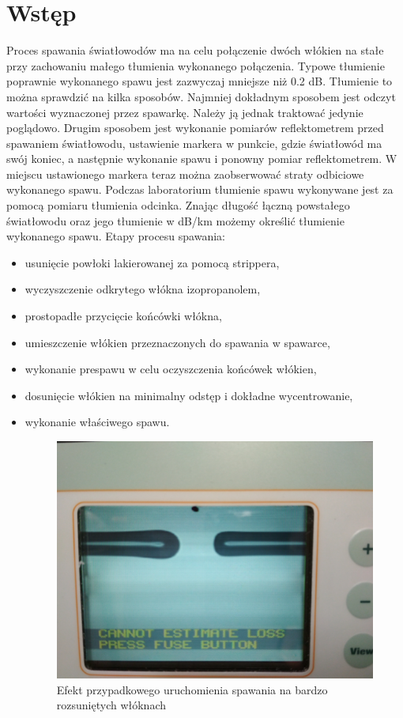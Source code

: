 \documentclass[12pt, a4paper, oneside]{article}
\begin{document}
\section{Wstęp}
\indent\indent Proces spawania światłowodów ma na celu połączenie dwóch włókien na stałe przy zachowaniu małego tłumienia wykonanego połączenia. Typowe tłumienie poprawnie wykonanego spawu jest zazwyczaj mniejsze niż 0.2 dB. Tłumienie to można sprawdzić na kilka sposobów. Najmniej dokładnym sposobem jest odczyt wartości wyznaczonej przez spawarkę. Należy ją jednak traktować jedynie poglądowo. Drugim sposobem jest wykonanie pomiarów reflektometrem przed spawaniem światłowodu, ustawienie markera w punkcie, gdzie światłowód ma swój koniec, a następnie wykonanie spawu i ponowny pomiar reflektometrem. W miejscu ustawionego markera teraz można zaobserwować straty odbiciowe wykonanego spawu. Podczas laboratorium tłumienie spawu wykonywane jest za pomocą pomiaru tłumienia odcinka. Znając długość łączną powstałego światłowodu oraz jego tłumienie w dB/km możemy określić tłumienie wykonanego spawu. Etapy procesu spawania:
\begin{itemize}
\item usunięcie powłoki lakierowanej za pomocą strippera,
\item wyczyszczenie odkrytego włókna izopropanolem,
\item prostopadłe przycięcie końcówki włókna,
\item umieszczenie włókien przeznaczonych do spawania w spawarce,
\item wykonanie prespawu w celu oczyszczenia końcówek włókien,
\item dosunięcie włókien na minimalny odstęp i dokładne wycentrowanie,
\item wykonanie właściwego spawu.
\begin{figure}[h]
\centering
\caption{Efekt przypadkowego uruchomienia spawania na bardzo rozsuniętych włóknach}
\includegraphics[scale=0.075]{f7.jpg}
\end{figure}
\end{itemize}
\clearpage
\end{document}
